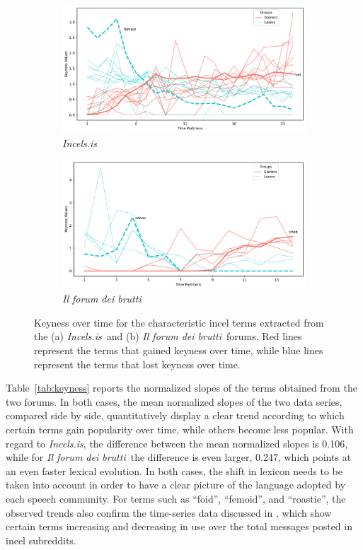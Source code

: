 \documentclass[11pt]{article}
\newcommand{\enforum}{\textit{Incels.is}}
\newcommand{\itforum}{\textit{Il forum dei brutti}}
\begin{document}
\begin{figure}[]
  \centering
  \begin{subfigure}[b]{\textwidth}
    \includegraphics[width=\textwidth]{images-tables/keyness_chart_incelsis.pdf}
    \caption{\enforum}
  \end{subfigure}
  \begin{subfigure}[b]{\textwidth}
    \includegraphics[width=\textwidth]{images-tables/keyness_chart_fdb.pdf}
    \caption{\itforum}
  \end{subfigure}
  \caption[Keyness graph for \enforum\, and \itforum.]{Keyness over time for the characteristic incel terms extracted from the (a) \enforum\, and (b) \itforum\, forums. Red lines represent the terms that gained keyness over time, while blue lines represent the terms that lost keyness over time.}
  \label{fig:keyness-over-time}
\end{figure}

Table~\ref{tab:keyness} reports the normalized slopes of the terms obtained from the two forums. In both cases, the mean normalized slopes of the two data series, compared side by side, quantitatively display a clear trend according to which certain terms gain popularity over time, while others become less popular. With regard to \enforum, the difference between the mean normalized slopes is 0.106, while for \itforum\, the difference is even larger, 0.247, which points at an even faster lexical evolution. In both cases, the shift in lexicon needs to be taken into account in order to have a clear picture of the language adopted by each speech community. For terms such as ``foid'', ``femoid'', and ``roastie'', the observed trends also confirm the time-series data discussed in , which show certain terms increasing and decreasing in use over the total messages posted in incel subreddits.
\end{document}
